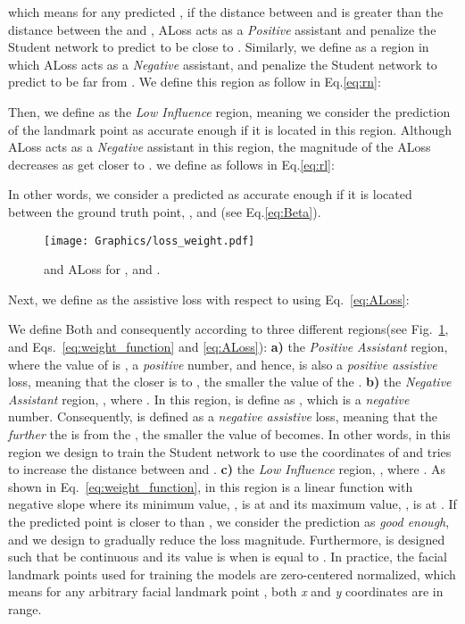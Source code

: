\documentclass[times,twocolumn,final,authoryear]{elsarticle}
\begin{document}
which means for any predicted , if the distance between  and  is greater than the distance between the  and , ALoss acts as a \textit{Positive} assistant and penalize the Student network to predict  to be close to . Similarly, we define  as a region in which ALoss acts as a \textit{Negative} assistant, and penalize the Student network to predict  to be far from . We define this region as follow in Eq.\ref{eq:rn}:



Then, we define  as the \textit{Low Influence} region, meaning we consider the prediction of the landmark point  as accurate enough if it is located in this region. Although ALoss acts as a \textit{Negative} assistant in this region, the magnitude of the ALoss decreases as  get closer to . we define  as follows in Eq.\ref{eq:rl}:

In other words, we consider a predicted  as accurate enough if it is located between the ground truth point, , and  (see Eq.\ref{eq:Beta}). 
\begin{figure}[t]
\centering
\texttt{[image: Graphics/loss\_weight.pdf]}
\caption{  and ALoss for , and .}
\label{fig:ALoss}
\end{figure}


Next, we define  as the assistive loss with respect to  using Eq.~\ref{eq:ALoss}:

We define Both  and consequently  according to three different regions(see Fig.~\ref{fig:ALoss}, and Eqs.~\ref{eq:weight_function} and \ref{eq:ALoss}): \textbf{a)} the \textit{Positive Assistant} region,  where the value of  is , a \textit{positive} number, and hence,  is also a \textit{positive assistive} loss, meaning that the closer  is to , the smaller the value of the . \textbf{b)} the \textit{Negative Assistant} region, , where . In this region,  is define as , which is a \textit{negative} number. Consequently,  is defined as a \textit{negative assistive} loss, meaning that the \textit{further} the  is from the , the smaller the value of  becomes. In other words, in this region we design  to train the Student network to use the coordinates of  and tries to increase the distance between  and . \textbf{c)} the \textit{Low Influence} region, , where . As shown in Eq.~\ref{eq:weight_function}, in this region  is a linear function with negative slope where its minimum value, , is at  and its maximum value, , is at . If the predicted point  is closer to  than , we consider the prediction as \textit{good enough}, and we design  to gradually reduce the loss magnitude. Furthermore,  is designed such that  be continuous and its value is  when  is equal to . In practice, the facial landmark points used for training the models are zero-centered normalized, which means for any arbitrary facial landmark point , both \textit{x} and \textit{y} coordinates are in  range. 
\end{document}
